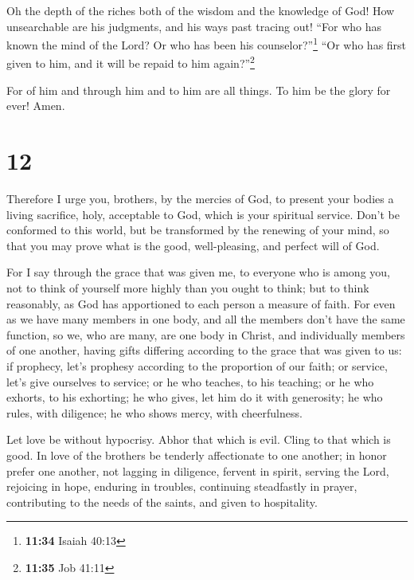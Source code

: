  Oh the depth of the riches both of the wisdom and the
knowledge of God! How unsearchable are his judgments, and his ways past
tracing out!  ``For who has known the mind of the Lord?
Or who has been his counselor?''\footnote{\textbf{11:34} Isaiah 40:13}
 ``Or who has first given to him, and it will be repaid
to him again?''\footnote{\textbf{11:35} Job 41:11}

 For of him and through him and to him are all things. To
him be the glory for ever! Amen.

\hypertarget{section-11}{%
\section{12}\label{section-11}}

 Therefore I urge you, brothers, by the mercies of God, to
present your bodies a living sacrifice, holy, acceptable to God, which
is your spiritual service.  Don't be conformed to this
world, but be transformed by the renewing of your mind, so that you may
prove what is the good, well-pleasing, and perfect will of God.

 For I say through the grace that was given me, to
everyone who is among you, not to think of yourself more highly than you
ought to think; but to think reasonably, as God has apportioned to each
person a measure of faith.  For even as we have many
members in one body, and all the members don't have the same function,
 so we, who are many, are one body in Christ, and
individually members of one another,  having gifts
differing according to the grace that was given to us: if prophecy,
let's prophesy according to the proportion of our faith; 
or service, let's give ourselves to service; or he who teaches, to his
teaching;  or he who exhorts, to his exhorting; he who
gives, let him do it with generosity; he who rules, with diligence; he
who shows mercy, with cheerfulness.

 Let love be without hypocrisy. Abhor that which is evil.
Cling to that which is good.  In love of the brothers be
tenderly affectionate to one another; in honor prefer one another,
 not lagging in diligence, fervent in spirit, serving the
Lord,  rejoicing in hope, enduring in troubles,
continuing steadfastly in prayer,  contributing to the
needs of the saints, and given to hospitality.

